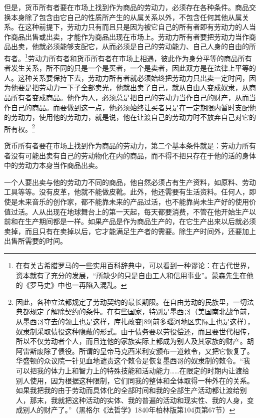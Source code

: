 \documentclass{ctexbook}
\begin{document}
    但是，货币所有者要在市场上找到作为商品的劳动力，必须存在各种条件。商品交换本身除了包含由它自己的性质所产生的从属关系以外，不包含任何其他从属关系。在这种前提下，劳动力只有而且只是因为被它自己的所有者即有劳动力的人当作商品出售或出卖，才能作为商品出现在市场上。劳动力所有者要把劳动力当作商品出卖，他就必须能够支配它，从而必须是自己的劳动能力、自己人身的自由的所有者。\footnote{在有关古希腊罗马的一些实用百科辞典中，可以看到一种谬论：在古代世界，资本就有了充分的发展，“所缺少的只是自由工人和信用事业”。蒙森先生在他的《罗马史》中也一再陷入混乱。}劳动力所有者和货币所有者在市场上相遇，彼此作为身分平等的商品所有者发生关系，所不同的只是一个是买者，一个是卖者，因此双方是在法律上平等的人。这种关系要保持下去，劳动力所有者就必须始终把劳动力只出卖一定时间，因为他要是把劳动力一下子全部卖光，他就出卖了自己，就从自由人变成奴隶，从商品所有者变成商品。他作为人，必须总是把自己的劳动力当作自己的财产，从而当作自己的商品。而要做到这一点，他必须始终让买者只是在一定期限内暂时支配他的劳动力，使用他的劳动力，就是说，他在让渡自己的劳动力时不放弃自己对它的所有权。\footnote{因此，各种立法都规定了劳动契约的最长期限。在自由劳动的民族里，一切法典都规定了解除契约的条件。在有些国家，特别是墨西哥（美国南北战争前，从墨西哥夺去的领土也是这样，库扎政变[89]前多瑙河地区实际上也是这样），奴隶制采取债役这种隐蔽的形式。由于债务要以劳役偿还，而且要世代相传，所以不仅劳动者个人，而且连他的家族实际上都成为别人及其家族的财产。胡阿雷斯废除了债役。所谓的皇帝马克西米利安颁布一道敕令，又把它恢复了。华盛顿的众议院一针见血地谴责这个敕令是恢复墨西哥的奴隶制的敕令。“我可以把我的体力上和智力上的特殊技能和活动能力……在限定的时期内让渡给别人使用，因为根据这种限制，它们同我的整体和全体取得一种外在的关系。如果我把我的由于劳动而具体化的全部时间和我的全部生产活动都让渡给别人，那末，我就把这种活动的实体、我的普遍的活动和现实性、我的人身，变成别人的财产了。”（黑格尔《法哲学》1840年柏林版第104页第67节）}

    货币所有者要在市场上找到作为商品的劳动力，第二个基本条件就是：劳动力所有者没有可能出卖有自己的劳动物化在内的商品，而不得不把只存在于他的活的身体中的劳动力本身当作商品出卖。

    一个人要出卖与他的劳动力不同的商品，他自然必须占有生产资料，如原料、劳动工具等等。没有皮革，他就不能做皮靴。此外，他还需要有生活资料。任何人，即使是未来音乐的创作家，都不能靠未来的产品过活，也不能靠尚未生产好的使用价值过活。人从出现在地球舞台上的第一天起，每天都要消费，不管在他开始生产以前和在生产期间都是一样。如果产品是作为商品生产的，在它生产出来以后就必须卖掉，而且只有在卖掉以后，它才能满足生产者的需要。除生产时间外，还要加上出售所需要的时间。
\end{document}
